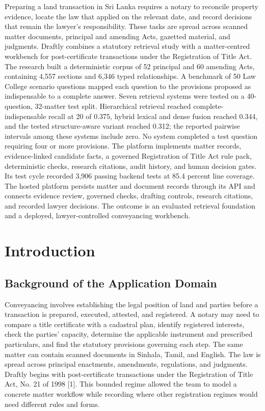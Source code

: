 \documentclass[12pt,a4paper]{article}
\begin{document}
Preparing a land transaction in Sri Lanka requires a notary to reconcile property evidence, locate the law that applied on the relevant date, and record decisions that remain the lawyer's responsibility. These tasks are spread across scanned matter documents, principal and amending Acts, gazetted material, and judgments. Draftly combines a statutory retrieval study with a matter-centred workbench for post-certificate transactions under the Registration of Title Act. The research built a deterministic corpus of 52 principal and 60 amending Acts, containing 4,557 sections and 6,346 typed relationships. A benchmark of 50 Law College scenario questions mapped each question to the provisions proposed as indispensable to a complete answer. Seven retrieval systems were tested on a 40-question, 32-matter test split. Hierarchical retrieval reached complete-indispensable recall at 20 of 0.375, hybrid lexical and dense fusion reached 0.344, and the tested structure-aware variant reached 0.312; the reported pairwise intervals among these systems include zero. No system completed a test question requiring four or more provisions. The platform implements matter records, evidence-linked candidate facts, a governed Registration of Title Act rule pack, deterministic checks, research citations, audit history, and human decision gates. Its test cycle recorded 3,906 passing backend tests at 85.4 percent line coverage. The hosted platform persists matter and document records through its API and connects evidence review, governed checks, drafting controls, research citations, and recorded lawyer decisions. The outcome is an evaluated retrieval foundation and a deployed, lawyer-controlled conveyancing workbench.

\clearpage
\tableofcontents
\clearpage
{}

\section{Introduction}

\subsection{Background of the Application Domain}

Conveyancing involves establishing the legal position of land and parties before a transaction is prepared, executed, attested, and registered. A notary may need to compare a title certificate with a cadastral plan, identify registered interests, check the parties' capacity, determine the applicable instrument and prescribed particulars, and find the statutory provisions governing each step. The same matter can contain scanned documents in Sinhala, Tamil, and English. The law is spread across principal enactments, amendments, regulations, and judgments. Draftly begins with post-certificate transactions under the Registration of Title Act, No. 21 of 1998 [1]. This bounded regime allowed the team to model a concrete matter workflow while recording where other registration regimes would need different rules and forms.
\end{document}
